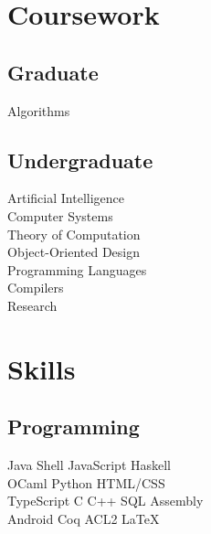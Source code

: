 \documentclass[letterpaper]{deedy-resume} %
\begin{document}
\begin{minipage}[t]{0.33\textwidth}
\section{Coursework}
\subsection{Graduate}
Algorithms
\sectionspace %

\subsection{Undergraduate}
Artificial Intelligence \\
Computer Systems \\
Theory of Computation \\
Object-Oriented Design \\
Programming Languages \\
Compilers \\
Research
\sectionspace %


\section{Skills}

\subsection{Programming}

Java \textbullet{} Shell \textbullet{} JavaScript \textbullet{} Haskell \\
OCaml \textbullet{} Python \textbullet{} HTML/CSS \\

TypeScript \textbullet{}  C \textbullet{} C++ \textbullet{} SQL \textbullet{} Assembly \\

Android  \textbullet{} Coq \textbullet{} ACL2 \textbullet{} \LaTeX\ \\

\sectionspace %


\end{minipage}
\end{document}

